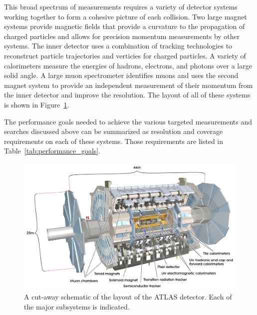 This broad spectrum of measurements requires a variety of detector systems working together to form a cohesive picture of each collision. 
Two large magnet systems provide magnetic fields that provide a curvature to the propagation of charged particles and allows for precision momentum measurements by other systems.
The inner detector uses a combination of tracking technologies to reconstruct particle trajectories and verticies for charged particles.
A variety of calorimeters measure the energies of hadrons, electrons, and photons over a large solid angle.
A large muon spectrometer identifies muons and uses the second magnet system to provide an independent measurement of their momentum from the inner detector and improve the resolution. 
The layout of all of these systems is shown in Figure~\ref{fig:atlas_overview}.


The performance goals needed to achieve the various targeted measurements and searches discussed above can be summarized as resolution and coverage requirements on each of these systems.
Those requirements are listed in Table~\ref{tab:performance_goals}.

\begin{figure}[hbtp]
\includegraphics[width=\fullfig]{figures/atlas_overview.pdf}
\caption{A cut-away schematic of the layout of the \ac{ATLAS} detector. Each of the major subsystems is indicated.}
\label{fig:atlas_overview}
\end{figure}


